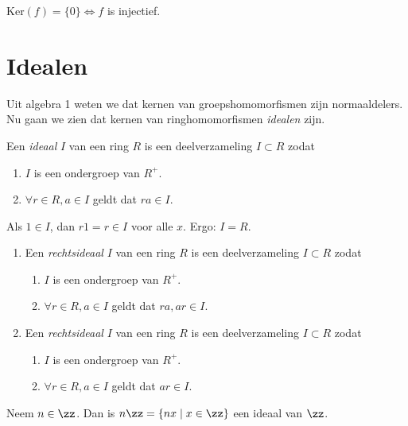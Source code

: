 \documentclass[a4paper,12pt,oneside]{book}
\begin{document}
\begin{opmerking}
$\mathrm{Ker}(f) = \{0\} \iff f$ is injectief.
\end{opmerking}

\section{Idealen}
Uit algebra 1 weten we dat kernen van groepshomomorfismen zijn normaaldelers. Nu gaan we zien dat kernen van ringhomomorfismen \textit{idealen} zijn.
\begin{definitie}
Een \textit{ideaal} $I$ van een ring $R$ is een deelverzameling $I \subset R$ zodat
\begin{enumerate}[label=(I\arabic*)]
\item $I$ is een ondergroep van $R^+$.
\item $\forall r \in R, a \in I$ geldt dat $ra \in I$.
\end{enumerate}
\end{definitie}

\begin{opmerking}
Als $1 \in I$, dan $r 1 = r \in I$ voor alle $x$. Ergo: $I = R$.
\end{opmerking}

\begin{definitie}
\begin{enumerate}[label=(\arabic*)]
\item Een \textit{rechtsideaal} $I$ van een ring $R$ is een deelverzameling $I \subset R$ zodat
\begin{enumerate}[label=(I\arabic*)]
\item $I$ is een ondergroep van $R^+$.
\item $\forall r \in R, a \in I$ geldt dat $ra, ar \in I$.
\end{enumerate}
\item Een \textit{rechtsideaal} $I$ van een ring $R$ is een deelverzameling $I \subset R$ zodat
\begin{enumerate}[label=(I\arabic*)]
\item $I$ is een ondergroep van $R^+$.
\item $\forall r \in R, a \in I$ geldt dat $ar \in I$.
\end{enumerate}
\end{enumerate}
\end{definitie}

\begin{voorbeeld}
Neem $n \in \zz$. Dan is $n\zz = \{nx \mid x\in \zz\}$ een ideaal van $\zz$.
\end{voorbeeld}
\end{document}
